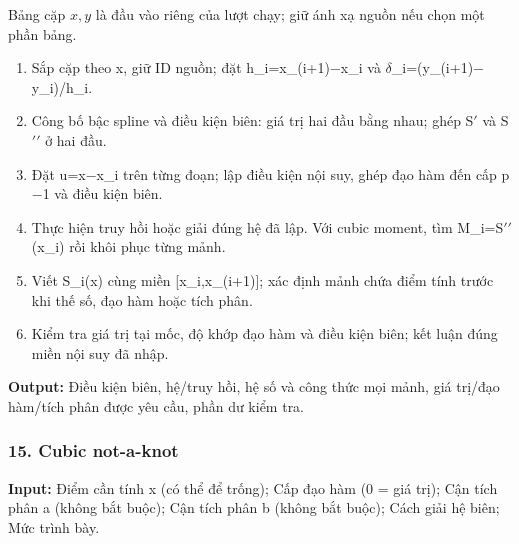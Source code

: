 Bảng cặp $x,y$ là đầu vào riêng của lượt chạy; giữ ánh xạ nguồn nếu chọn một phần bảng.

\begin{enumerate}

\item Sắp cặp theo x,\allowbreak{} giữ ID nguồn;\allowbreak{} đặt h\_i=\allowbreak{}x\_(\allowbreak{}i+\allowbreak{}1)\ensuremath{-}x\_i và \ensuremath{\delta}\_i=\allowbreak{}(\allowbreak{}y\_(\allowbreak{}i+\allowbreak{}1)\ensuremath{-}y\_i)/\allowbreak{}h\_i.

\item Công bố bậc spline và điều kiện biên: giá trị hai đầu bằng nhau;\allowbreak{} ghép S\ensuremath{\prime} và S\ensuremath{\prime\prime} ở hai đầu.

\item Đặt u=\allowbreak{}x\ensuremath{-}x\_i trên từng đoạn;\allowbreak{} lập điều kiện nội suy,\allowbreak{} ghép đạo hàm đến cấp p\ensuremath{-}1 và điều kiện biên.

\item Thực hiện truy hồi hoặc giải đúng hệ đã lập. Với cubic moment,\allowbreak{} tìm M\_i=\allowbreak{}S\ensuremath{\prime\prime}(\allowbreak{}x\_i) rồi khôi phục từng mảnh.

\item Viết S\_i(\allowbreak{}x) cùng miền [x\_i,\allowbreak{}x\_(\allowbreak{}i+\allowbreak{}1)];\allowbreak{} xác định mảnh chứa điểm tính trước khi thế số,\allowbreak{} đạo hàm hoặc tích phân.

\item Kiểm tra giá trị tại mốc,\allowbreak{} độ khớp đạo hàm và điều kiện biên;\allowbreak{} kết luận đúng miền nội suy đã nhập.

\end{enumerate}

\textbf{Output:} Điều kiện biên,\allowbreak{} hệ/\allowbreak{}truy hồi,\allowbreak{} hệ số và công thức mọi mảnh,\allowbreak{} giá trị/\allowbreak{}đạo hàm/\allowbreak{}tích phân được yêu cầu,\allowbreak{} phần dư kiểm tra.

\examplebreak\subsubsection*{15. Cubic not-a-knot}

\textbf{Input:} Điểm cần tính x (\allowbreak{}có thể để trống);\allowbreak{} Cấp đạo hàm (\allowbreak{}0 =\allowbreak{} giá trị);\allowbreak{} Cận tích phân a (\allowbreak{}không bắt buộc);\allowbreak{} Cận tích phân b (\allowbreak{}không bắt buộc);\allowbreak{} Cách giải hệ biên;\allowbreak{} Mức trình bày.

